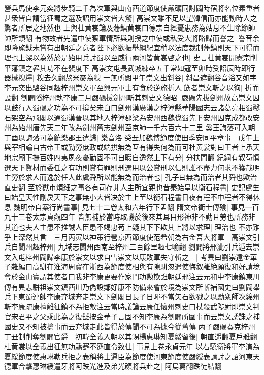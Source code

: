 營兵馬使李元奕將步騎二千為次軍與山南西道節度使嚴礪同討闢時宿將名位素重者甚衆皆自謂當征蜀之選及詔用崇文皆大驚|{
	高崇文雖不足以望韓信而亦能動時人之驚者所居之地然也}
上與杜黄裳論及藩鎮黄裳曰德宗自經憂患務為姑息不生除節帥|{
	帥所類翻}
有物故者先遣中使察軍情所與則授之中使或私受大將賂歸而譽之|{
	譽音余}
即降旄鉞未嘗有出朝廷之意者陛下必欲振舉綱紀宜稍以法度裁制藩鎮則天下可得而理也上深以為然於是始用兵討蜀以至威行兩河皆黄裳啓之也|{
	史言杜黄裳開憲宗削平藩鎮之畧其功不在裴度下}
高崇文屯長武城練卒五千常如寇至卯時受詔辰時即行器械糗糧|{
	糗去久翻熬米麥為糗}
一無所闕甲午崇文出斜谷|{
	斜昌遮翻谷音浴又如字}
李元奕出駱谷同趣梓州崇文軍至興元軍士有食於逆旅折人筯者崇文斬之以徇|{
	折而設翻}
劉闢䧟梓州執李康二月嚴礪拔劍州斬其刺史文德昭|{
	嚴礪先拔劍州故高崇文因以鼓行入蜀礪之功為不可揜矣宋白曰劍州漢廣漢之梓潼縣華陽國志云諸葛亮相蜀鑿石架空為飛閣以通蜀漢晉以其地入梓潼郡梁為安州西魏伐蜀先下安州因克成都改安州為始州唐先天二年改為劍州舊志劍州至京師一千六百六十二里}
奚王誨落可入朝丁酉以誨落可為饒樂郡王遣歸|{
	樂音洛}
癸丑加魏博節度使田季安同平章事　戊午上與宰相論自古帝王或勤勞庶政或端拱無為互有得失何為而可杜黄裳對曰王者上承天地宗廟下撫百姓四夷夙夜憂勤固不可自暇自逸然上下有分|{
	分扶問翻}
紀綱有叙苟慎選天下賢材而委任之有功則賞有罪則刑選用以公賞刑以信則誰不盡力何求不獲哉明主勞於求人而逸於任人此虞舜所以能無為而治者也|{
	孔子曰無為而治者其舜也歟治直吏翻}
至於獄市煩細之事各有司存非人主所宜親也昔秦始皇以衡石程書|{
	史記盧生曰始皇天性剛戾天下之事無小大皆决於主上至以衡石程書日夜有程不中程者不得休息}
魏明帝自案行尚書事|{
	見七十二卷太和六年行下孟翻}
隋文帝衛士傳飱|{
	事見一百九十三卷太宗貞觀四年}
皆無補於當時取譏於後來其耳目形神非不勤且勞也所務非其道也夫人主患不推誠人臣患不竭忠苟上疑其下下欺其上將以求理|{
	理治也}
不亦難乎上深然其言　三月丙寅以神策行營京西節度使范希朝為右金吾大將軍　高崇文引兵自閬州趣梓州|{
	九域志閬州西南至梓州三百餘里趣七喻翻}
劉闢將邢泚引兵遁去崇文入屯梓州闢歸李康於崇文以求自雪崇文以康敗軍失守斬之　|{
	考異曰劉崇遠金華子雜編曰高駢在淮海周寶在浙西為節度使相與有隙駢忽遣使悔叙離絶願復和好請境會於金山寶謂其使者曰我非李康更要作家門功勲欺誑朝廷邪注云元和中李康鎮東川傳有異志駢祖崇文鎮西川乃偽設鄰好康不防備來會於境為崇文所斬補國史曰劉闢舉兵下東蜀連帥李康弃城奔走崇文下劍閣日長子日暉不當矢石欲戮之以勵衆師次綿州斬李康疏康擅離征鎮不為拒敵注云當時議論云康任懷州刺史曰杖殺武陟尉即崇文判官宋君平之父乘此為之復讎按金華子言固不知李康為劉闢所圍事而云崇文誘誅之補國史又不知被擒事而云弃城走此皆得於傳聞不可為據今從舊傳}
丙子嚴礪奏克梓州丁丑制削奪劉闢官爵　初韓全義入朝以其甥楊惠琳知夏綏留後|{
	朝直遥翻夏戶雅翻}
杜黄裳以全義出征無功驕蹇不遜直令致仕|{
	事見上卷永貞元年}
以右驍衛將軍李演為夏綏節度使惠琳勒兵拒之表稱將士逼臣為節度使河東節度使嚴綬表請討之詔河東天德軍合擊惠琳綬遣牙將阿跌光進及弟光顔將兵赴之|{
	阿烏葛翻跌徒結翻}
